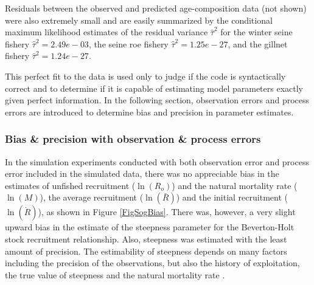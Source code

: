 Residuals between the observed and predicted age-composition data (not shown) were also extremely small and are easily summarized by the conditional maximum likelihood estimates of the residual variance 	$\widehat{\tau}^2$ for the winter seine fishery $\widehat{\tau}^2=2.49e-03$, the seine roe fishery $\widehat{\tau}^2=1.25e-27$, and the gillnet fishery  $\widehat{\tau}^2=1.24e-27$.  

This perfect fit to the data is used only to judge if the code is syntactically correct and to determine if it is capable of estimating model parameters exactly given perfect information.  In the following section, observation errors and process errors are introduced to determine bias and precision in parameter estimates.
		
		\subsubsection{Bias \& precision with observation \& process errors}

In the simulation experiments conducted with both observation error and process error included in the simulated data, there was no appreciable bias in the estimates of unfished recruitment ($\ln(R_o)$) and the natural mortality rate ($\ln(M)$),  the average recruitment ($\ln(\bar{R})$) and the initial recruitment ($\ln(\dot{R})$), as shown in Figure \ref{FigSogBias}.   There was, however, a very slight upward bias in the estimate of the steepness parameter for the Beverton-Holt stock recruitment relationship.  Also, steepness was estimated with the least amount of precision.  The estimability of steepness depends on many factors including the precision of the observations, but also the history of exploitation, the true value of steepness and the natural mortality rate \citep{conn2010can}.
		
